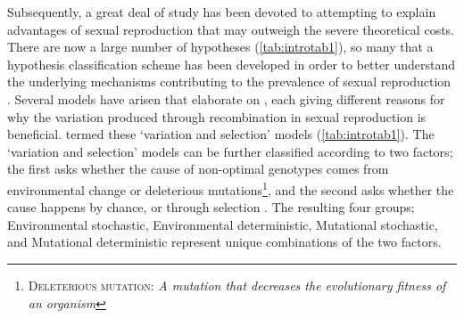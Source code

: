 Subsequently, a great deal of study has been devoted to attempting to explain advantages of sexual reproduction that may outweigh the severe theoretical costs. There are now a large number of hypotheses (\cref{tab:introtab1}), so many that a hypothesis classification scheme has been developed in order to better understand the underlying mechanisms contributing to the prevalence of sexual reproduction \parencite{kondrashov_classification_1993}. Several models have arisen that elaborate on \textcite{weismann_significance_1889,weismann_amphimixis_1892}, each giving different reasons for why the variation produced through recombination in sexual reproduction is beneficial. \textcite{kondrashov_classification_1993} termed these `variation and selection' models (\cref{tab:introtab1}). The `variation and selection' models can be further classified according to two factors; the first asks whether the cause of non-optimal genotypes comes from environmental change or deleterious mutations\footnote[1]{\textsc{Deleterious mutation:} \textit{A mutation that decreases the evolutionary fitness of an organism}}, and the second asks whether the cause happens by chance, or through selection \parencite{kondrashov_classification_1993}. The resulting four groups; Environmental stochastic, Environmental deterministic, Mutational stochastic, and Mutational deterministic represent unique combinations of the two factors.

